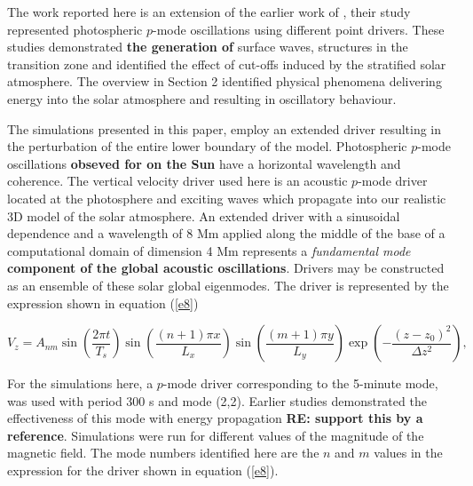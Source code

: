 \documentclass[physics,article,submit,pdftex,moreauthors]{Definitions/mdpi}
\begin{document}
The work reported here is an extension of the earlier work of \citet{Malins2007}, their study represented photospheric $p$-mode oscillations using different point drivers. These studies demonstrated {\bf the generation of} surface waves, structures in the transition zone and identified the effect of cut-offs induced by the stratified  solar atmosphere. The overview in Section 2 identified physical phenomena delivering energy into the solar atmosphere and resulting in oscillatory behaviour. 

The simulations presented in this paper, employ an extended driver resulting in the perturbation of the entire lower boundary of the model.  Photospheric $p$-mode oscillations {\bf obseved for on the Sun} have a horizontal wavelength and coherence. The vertical velocity driver used here is an acoustic $p$-mode driver located at the photosphere and exciting waves which propagate 
into our realistic 3D model of the solar atmosphere. An extended driver with a sinusoidal dependence and a wavelength of 8 Mm applied along the middle of the base of a computational domain of dimension 4 Mm represents  a {\it fundamental mode} {\bf component of the global acoustic oscillations}. Drivers may be constructed as an ensemble of these solar global eigenmodes. The driver is represented by the expression shown in equation (\ref{e8}) 


\begin{equation}
 V_{z}  =  A_{nm} \sin\left(\frac{2\pi t}{T_s} \right)\sin\left(  \frac{(n+1)\pi x}{L_x} \right)  
 \sin\left(\frac{(m+1)\pi y}{L_y} \right) \exp\left( -\frac{(z-z_0)^2}{\Delta z^2} \right),
\label{e8}
\end{equation}

For the  simulations here, a $p$-mode driver corresponding to the 5-minute mode, was used with period 300 s and mode (2,2). Earlier studies demonstrated the effectiveness of this mode with energy propagation {\bf RE: support this by a reference}. Simulations were run for different values of the magnitude of the magnetic field. The mode numbers identified here are the $n$ and $m$ values in the expression for the driver shown in equation (\ref{e8}).

\end{document}
